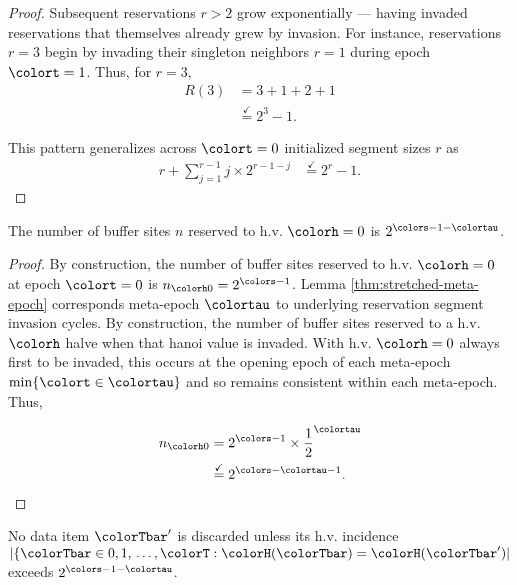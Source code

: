 \begin{proof}
Subsequent reservations $r>2$ grow exponentially --- having invaded reservations that themselves already grew by invasion.
For instance, reservations $r=3$ begin by invading their singleton neighbors $r=1$ during epoch $\colort=1$.
Thus, for $r=3$,
\begin{align*}
R(3)
&= 3 + 1 + 2 + 1\\
&\stackrel{\checkmark}{=} 2^3 - 1.
\end{align*}

This pattern generalizes across $\colort=0$ initialized segment sizes $r$ as
\begin{align*}
r + \sum_{j=1}^{r-1} j \times 2^{r-1-j}
&\stackrel{\checkmark}{=} 2^{r} - 1.
\end{align*}

\end{proof}

\begin{corollary}
\label{thm:num-hv0-reservations}
The number of buffer sites $n$ reserved to h.v. $\colorh=0$ is $2^{\colors-1-\colortau}$.
\end{corollary}

\begin{proof}
By construction, the number of buffer sites reserved to h.v. $\colorh=0$ at epoch $\colort=0$ is $n_{\colorh0}=2^{\colors - 1}$.
Lemma \ref{thm:stretched-meta-epoch} corresponds meta-epoch $\colortau$ to underlying reservation segment invasion cycles.
By construction, the number of buffer sites reserved to a h.v. $\colorh$ halve when that hanoi value is invaded.
With h.v. $\colorh=0$ always first to be invaded, this occurs at the opening epoch of each meta-epoch $\min\{\colort \in \colortau\}$ and so remains consistent within each meta-epoch.
Thus,

\begin{align*}
n_{\colorh0}
&= 2^{\colors - 1} \times \frac{1}{2}^{\colortau}\\
&\stackrel{\checkmark}{=} 2^{\colors - \colortau - 1}.
\end{align*}
\end{proof}

\begin{lemma}
\label{thm:discarded-incidence-count}
No data item $\colorTbar'$ is discarded unless its h.v. incidence $|\{\colorTbar \in 0,1,\,\ldots,\colorT : \colorH(\colorTbar) = \colorH(\colorTbar')|$ exceeds $2^{\colors - 1 - \colortau}$.
\end{lemma}

